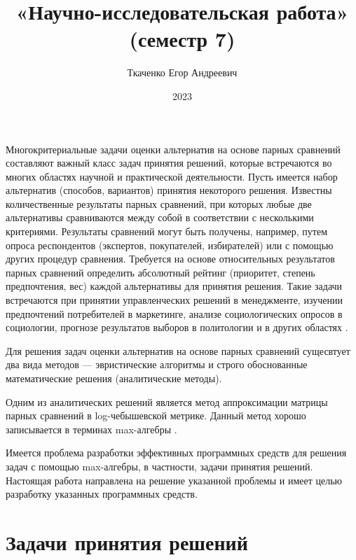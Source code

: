 \documentclass[specialist, substylefile = spbureport.rtx,
    subf,href,colorlinks=true, 12pt]{disser}
\title{«Научно-исследовательская работа» (семестр 7)}
\author{Ткаченко Егор Андреевич}
\date{2023}
\begin{document}
    \maketitle
    \pagebreak
    \tableofcontents
    \pagebreak

    \intro

        Многокритериальные задачи оценки альтернатив на основе парных сравнений составляют важный класс задач принятия решений, которые встречаются во многих областях научной и практической деятельности. Пусть имеется набор альтернатив (способов, вариантов) принятия некоторого решения. Известны количественные результаты парных сравнений, при которых любые две альтернативы сравниваются между собой в соответствии с несколькими критериями. Результаты сравнений могут быть получены, например, путем опроса респондентов (экспертов, покупателей, избирателей) или с помощью других процедур сравнения. Требуется на основе относительных результатов парных сравнений определить абсолютный рейтинг (приоритет, степень предпочтения, вес) каждой альтернативы для принятия решения. Такие задачи встречаются при принятии управленческих решений в менеджменте, изучении предпочтений потребителей в маркетинге, анализе социологических опросов в социологии, прогнозе результатов выборов в политологии и в других областях \cite{Krivulin2020Reshenie}. 

        Для решения задач оценки альтернатив на основе парных сравнений сущесвтует два вида методов --- эвристические алгоритмы и строго обоснованные математические решения (аналитические методы).

        Одним из аналитических решений является метод аппроксимации матрицы парных сравнений в log-чебышевской метрике. Данный метод хорошо записывается в терминах max-алгебры \cite{Krivulin2019Metody}.

        Имеется проблема разработки эффективных программных средств для решения задач с помощью max-алгебры, в частности, задачи принятия решений. Настоящая работа направлена на решение указанной проблемы и имеет целью разработку указанных программных средств.


    \chapter{Задачи принятия решений}

\end{document}
